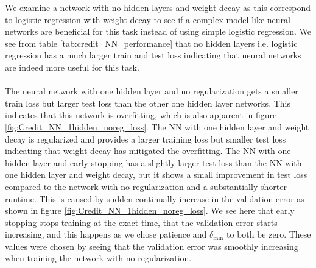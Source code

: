 \begin{table} 
\caption{Performance measurement for neural network models on Boston Housing data. Early stopping ran 194 epochs. The Python code used to implement these neural networks can be seen in appendix \ref{app:Credit_NN}.}
\label{tab:credit_NN_performance}
\end{table}
\noindent
We examine a network with no hidden layers and weight decay as this correspond to logistic regression with weight decay to see if a complex model like neural networks are beneficial for this task instead of using simple logistic regression. We see from table \ref{tab:credit_NN_performance} that no hidden layers i.e. logistic regression has a much larger train and test loss indicating that neural networks are indeed more useful for this task. 
\\
\\
The neural network with one hidden layer and no regularization gets a smaller train loss but larger test loss than the other one hidden layer networks. This indicates that this network is overfitting, which is also apparent in figure \ref{fig:Credit_NN_1hidden_noreg_loss}. The NN with one hidden layer and weight decay is regularized and provides a larger training loss but smaller test loss indicating that weight decay has mitigated the overfitting. The NN with one hidden layer and early stopping has a slightly larger test loss than the NN with one hidden layer and weight decay, but it shows a small improvement in test loss compared to the network with no regularization and a substantially shorter runtime. This is caused by sudden continually increase in the validation error as shown in figure \ref{fig:Credit_NN_1hidden_noreg_loss}. We see here that early stopping stops training at the exact time, that the validation error starts increasing, and this happens as we chose patience and $\delta_{\text{min}}$ to both be zero. These values were chosen by seeing that the validation error was smoothly increasing when training the network with no regularization. 


